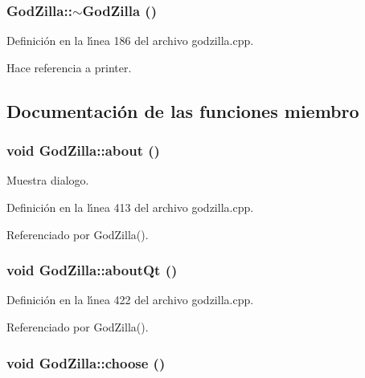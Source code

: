 \subsubsection{\setlength{\rightskip}{0pt plus 5cm}God\-Zilla::$\sim$God\-Zilla ()}\label{classGodZilla_a1}




Definici\'{o}n en la l\'{\i}nea 186 del archivo godzilla.cpp.

Hace referencia a printer.

\subsection{Documentaci\'{o}n de las funciones miembro}
\subsubsection{\setlength{\rightskip}{0pt plus 5cm}void God\-Zilla::about ()\hspace{0.3cm}{\tt  [private, slot]}}\label{classGodZilla_k11}


Muestra dialogo. 



Definici\'{o}n en la l\'{\i}nea 413 del archivo godzilla.cpp.

Referenciado por God\-Zilla().
\subsubsection{\setlength{\rightskip}{0pt plus 5cm}void God\-Zilla::about\-Qt ()\hspace{0.3cm}{\tt  [private, slot]}}\label{classGodZilla_k12}




Definici\'{o}n en la l\'{\i}nea 422 del archivo godzilla.cpp.

Referenciado por God\-Zilla().
\subsubsection{\setlength{\rightskip}{0pt plus 5cm}void God\-Zilla::choose ()\hspace{0.3cm}{\tt  [private, slot]}}\label{classGodZilla_k5}




